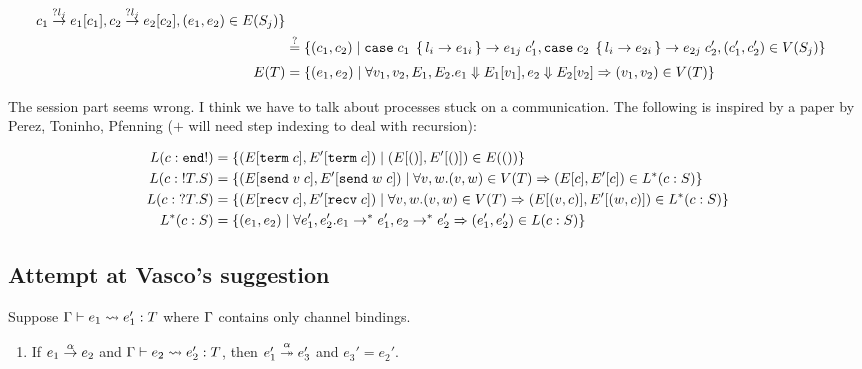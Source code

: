 \begin{align*}
                         c_1 \stackrel{?l_j}{\to} e_1[c_1],
                c_2 \stackrel{?l_j}{\to} e_2[c_2],
                         (e_1, e_2) \in E(S_j) \}
  \\&\stackrel{?}{=}
  \{ (c_1, c_2) \mid
  \reduce{\ECase{c_1}{l_i \to e_{1i}}}{e_{1j}\; c_1'}, 
  \reduce{\ECase{c_2}{l_i \to e_{2i}}}{e_{2j}\; c_2'},
  (c_1', c_2') \in V (S_j)
  \}
  \\
  E (T) &= \{ (e_1, e_2) \mid \forall v_1, v_2, E_1, E_2. \reduceto{e_1}{E_1[v_1]}, \reduceto{e_2}{ E_2[v_2]} \Rightarrow (v_1, v_2)\in V (T) \}
\end{align*}

The session part seems wrong. I think we have to talk about processes stuck on a communication.
The following is inspired by a paper by Perez, Toninho, Pfenning ($+$ will need step indexing to deal with recursion): 

\begin{align*}
  L (c : \TEnd!) &= \{ (E[ \ETerm c ], E'[ \ETerm c ]) \mid (E[\EUnit], E'[\EUnit]) \in E (\TUnit)
                   \}
  \\
  L (c : \TOut TS) &= \{ (E[ \ESend v c ], E'[ \ESend w c ]) \mid \forall v, w. (v, w) \in V (T) \Rightarrow (E[c], E'[c]) \in L^* (c : S) \}
  \\
  L (c : \TIn TS) &= \{ (E[ \ERecv c ], E'[ \ERecv c ]) \mid \forall v, w. (v, w) \in V (T) \Rightarrow (E[(v,c)], E'[(w,c)]) \in L^* (c : S) \}
  \\
  L^* (c : S) &= \{ (e_1, e_2) \mid \forall e_1', e_2'. e_1 \to^* e_1', e_2 \to^* e_2' \Rightarrow (e_1', e_2') \in L (c : S) \}
\end{align*}

\subsection{Attempt at Vasco's suggestion}
\label{sec:attempt-at-vascos}

\begin{lemma}
  Suppose $\Ctxt \vdash e_1 \leadsto e'_1 : T$ where $\Ctxt$ contains only
  channel bindings.
  \begin{enumerate}
  \item
    If $\reduce[\alpha]{e_1}{e_2}$
    and $\Ctxt \vdash e_2 \leadsto e'_2 : T$, then
    $\reducemany[\alpha]{e'_1}{e'_3}$ and $e_3' = e_2'$.
  \end{enumerate}
\end{lemma}

